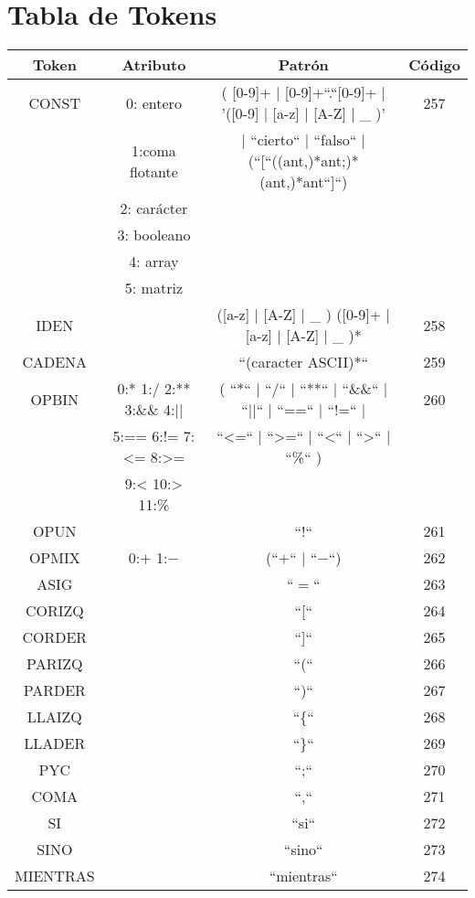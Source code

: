 \newpage
\section{Tabla de Tokens}

\begin{table}
\centering
\begin{tabular}{| c | c | c | c |}
	\hline
	Token & Atributo & Patrón & Código \\ \hline
	CONST & 0: entero & ( [0-9]+ | [0-9]+``.``[0-9]+ | '([0-9] | [a-z] | [A-Z] | \_ )'  & 257 \\
	& 1:coma flotante & | ``cierto`` | ``falso`` | (``[``((ant,)*ant;)*(ant,)*ant``]``) &  \\ 
	& 2: carácter & & \\
	& 3: booleano & & \\
	& 4: array & & \\
	& 5: matriz & & \\ \hline
	IDEN & & ([a-z] | [A-Z] | \_ ) ([0-9]+ | [a-z] | [A-Z] | \_ )* & 258 \\ \hline
	CADENA & & ``(caracter ASCII)*`` & 259 \\ \hline
	OPBIN & 0:*  1:/  2:**  3:\&\& 4:|| & ( ``*``  |  ``/``  |  ``**``  |  ``\&\&``  |  ``||`` |  ``==`` |  ``$!$=``  |   & 260 \\
	&   5:== 6:!= 7:\textless{}= 8:>= 	& ``\textless{}=``  |  ``\textgreater=``  |  ``\textless`` |  ``\textgreater``  |  ``\%``  )& \\ 
	& 9:< 10:> 11:\% & & \\ \hline
OPUN & & ``$!$`` &  261 \\ \hline
OPMIX & 0:$+$ 1:$-$ & (``$+$`` | ``$-$``) & 262 \\ \hline
ASIG &  & ``$=$`` & 263 \\ \hline
CORIZQ & & ``[`` & 264 \\ \hline
CORDER & & ``]`` & 265\\ \hline
PARIZQ & & ``(`` & 266\\ \hline
PARDER & & ``)`` & 267\\ \hline
LLAIZQ & & ``\{`` & 268\\ \hline
LLADER & & ``\}`` & 269\\ \hline
PYC & & ``;`` & 270\\ \hline
COMA & & ``,`` & 271\\ \hline
SI & & ``si`` & 272\\ \hline
SINO & & ``sino`` & 273\\ \hline
MIENTRAS & & ``mientras`` & 274\\ \hline

\end{tabular}
\end{table}
